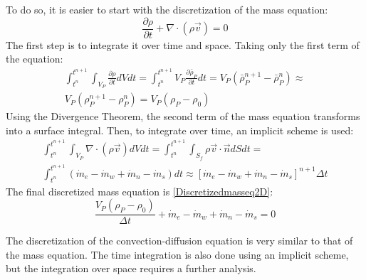 To do so, it is easier to start with the discretization of the mass equation:
\begin{equation}
\frac{\partial\rho}{\partial t}+\nabla\cdot\left(\rho\vec{v}\right)=0
\end{equation}
The first step is to integrate it over time and space. Taking only the first term of the equation:
\begin{multline}
\int_{t^{n}}^{t^{n+1}}\int_{V_{P}}^{}\frac{\partial\rho}{\partial t}dVdt=\int_{t^{n}}^{t^{n+1}}V_{P}\frac{\partial\bar{\rho}_{P}}{\partial t}dt=V_{P}\left(\bar{\rho}_{P}^{n+1}-\bar{\rho}_{P}^{n}\right)\approx \\
V_{P}\left(\rho_{P}^{n+1}-\rho_{P}^{n}\right)=V_{P}\left(\rho_{P}-\rho_{0}\right)
\end{multline}
Using the Divergence Theorem, the second term of the mass equation transforms into a surface integral. Then, to integrate over time, an implicit scheme is used:
\begin{multline}
\int_{t^{n}}^{t^{n+1}}\int_{V_{P}}^{}\nabla\cdot\left(\rho\vec{v}\right)dVdt=\int_{t^{n}}^{t^{n+1}}\int_{S_{f}}^{}\rho\vec{v}\cdot\vec{n}dSdt= \\
\int_{t^{n}}^{t^{n+1}}\left(\dot{m}_{e}-\dot{m}_{w}+\dot{m}_{n}-\dot{m}_{s}\right)dt\approx\left[\dot{m}_{e}-\dot{m}_{w}+\dot{m}_{n}-\dot{m}_{s}\right]^{n+1}\Delta t
\end{multline}
The final discretized mass equation is \ref{Discretizedmasseq2D}:
\begin{equation}
\frac{V_{P}\left(\rho_{P}-\rho_{0}\right)}{\Delta t}+\dot{m}_{e}-\dot{m}_{w}+\dot{m}_{n}-\dot{m}_{s}=0
\label{Discretizedmasseq2D}
\end{equation}

The discretization of the convection-diffusion equation is very similar to that of the mass equation. The time integration is also done using an implicit scheme, but the integration over space requires a further analysis.

